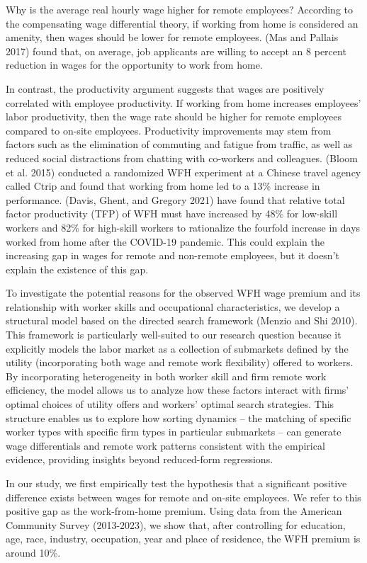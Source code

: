 \documentclass[
  11pt,
  letterpaper,
  DIV=11,
  numbers=noendperiod]{scrartcl}
\theoremstyle{plain}
\theoremstyle{remark}
\begin{document}
Why is the average real hourly wage higher for remote employees?
According to the compensating wage differential theory, if working from
home is considered an amenity, then wages should be lower for remote
employees. (Mas and Pallais 2017) found that, on average, job applicants
are willing to accept an 8 percent reduction in wages for the
opportunity to work from home.

In contrast, the productivity argument suggests that wages are
positively correlated with employee productivity. If working from home
increases employees' labor productivity, then the wage rate should be
higher for remote employees compared to on-site employees. Productivity
improvements may stem from factors such as the elimination of commuting
and fatigue from traffic, as well as reduced social distractions from
chatting with co-workers and colleagues. (Bloom et al. 2015) conducted a
randomized WFH experiment at a Chinese travel agency called Ctrip and
found that working from home led to a 13\% increase in performance.
(Davis, Ghent, and Gregory 2021) have found that relative total factor
productivity (TFP) of WFH must have increased by 48\% for low-skill
workers and 82\% for high-skill workers to rationalize the fourfold
increase in days worked from home after the COVID-19 pandemic. This
could explain the increasing gap in wages for remote and non-remote
employees, but it doesn't explain the existence of this gap.

To investigate the potential reasons for the observed WFH wage premium
and its relationship with worker skills and occupational
characteristics, we develop a structural model based on the directed
search framework (Menzio and Shi 2010). This framework is particularly
well-suited to our research question because it explicitly models the
labor market as a collection of submarkets defined by the utility
(incorporating both wage and remote work flexibility) offered to
workers. By incorporating heterogeneity in both worker skill and firm
remote work efficiency, the model allows us to analyze how these factors
interact with firms' optimal choices of utility offers and workers'
optimal search strategies. This structure enables us to explore how
sorting dynamics -- the matching of specific worker types with specific
firm types in particular submarkets -- can generate wage differentials
and remote work patterns consistent with the empirical evidence,
providing insights beyond reduced-form regressions.

In our study, we first empirically test the hypothesis that a
significant positive difference exists between wages for remote and
on-site employees. We refer to this positive gap as the work-from-home
premium. Using data from the American Community Survey (2013-2023), we
show that, after controlling for education, age, race, industry,
occupation, year and place of residence, the WFH premium is around 10\%.
\end{document}
